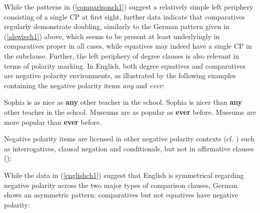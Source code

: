While the patterns in (\ref{comparisonch1}) suggest a relatively simple left periphery consisting of a single CP at first sight, further data indicate that comparatives regularly demonstrate doubling, similarly to the German pattern given in (\ref{alswiech1}) above, which seems to be present at least underlyingly in comparatives proper in all cases, while equatives may indeed have a single CP in the subclause. Further, the left periphery of degree clauses is also relevant in terms of polarity marking. In English, both degree equatives and comparatives are negative polarity environments, as illustrated by the following examples containing the negative polarity items \textit{any} and \textit{ever}:

\ea \label{englishch1}
\ea Sophia is as nice as \textbf{any} other teacher in the school. \label{asanych1}
\ex Sophia is nicer than \textbf{any} other teacher in the school. \label{thananych1}
\ex Museums are as popular as \textbf{ever} before. \label{aseverch1}
\ex Museums are more popular than \textbf{ever} before. \label{thaneverch1}
\z
\z

Negative polarity items are licensed in other negative polarity contexts (cf. \citealt{klima1964}) such as interrogatives, clausal negation and conditionals, but not in affirmative clauses (\citealt[531, ex. 11]{seuren1973}):

\ea
{}
\z
\z

While the data in (\ref{englishch1}) suggest that English is symmetrical regarding negative polarity across the two major types of comparison clauses, German shows an asymmetric pattern: comparatives but not equatives have negative polarity:

\ea \label{germanch1}
\z
\z

